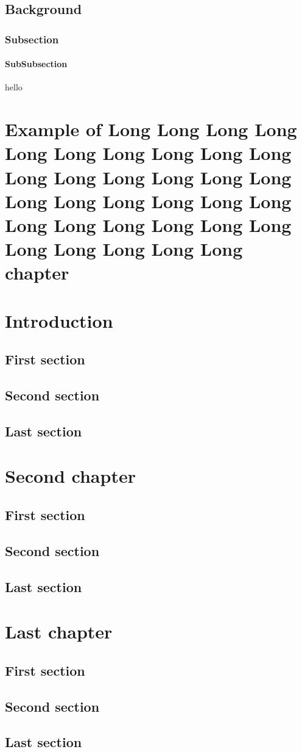 \documentclass{mines-thesis}
\begin{document}
\lipsum[1]
\section{Background}
\lipsum[1-2]
\subsection{Subsection}
\lipsum[4-5]
\subsubsection{SubSubsection}
\lipsum[1]
hello
\chapter{Example of Long  Long Long Long Long Long Long Long Long Long Long Long Long Long Long Long Long Long Long Long Long Long Long Long Long Long Long Long Long Long Long Long Long chapter}
\lipsum[1-10]
\chapter{Introduction} \lipsum[1]
\section{First section} \lipsum[2-3]
\section{Second section} \lipsum[4-5]
\section{Last section} \lipsum[6-7]
\chapter{Second chapter} \lipsum[1]
\section{First section} \lipsum[2-3]
\section{Second section} \lipsum[4-5]
\section{Last section} \lipsum[6-7]
\chapter{Last chapter} \lipsum[1]
\section{First section} \lipsum[2-3]
\section{Second section} \lipsum[4-5]
\section{Last section} \lipsum[6-7]

\end{document}
